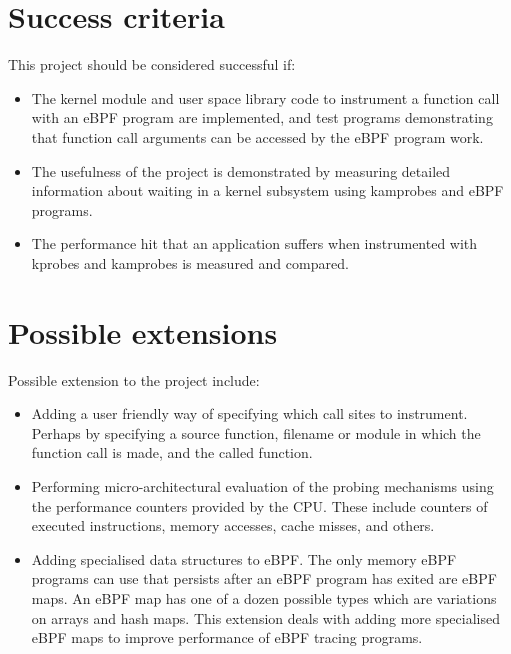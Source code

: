 \section*{Success criteria}

    This project should be considered successful if:
    \begin{itemize}
        \item The kernel module and user space library code to instrument a function call with an eBPF program are implemented, and
        test programs demonstrating that function call arguments can be accessed by the eBPF program work.

        \item The usefulness of the project is demonstrated by measuring detailed information about waiting in 
        a kernel subsystem using kamprobes and eBPF programs.

        \item The performance hit that an application suffers when instrumented with kprobes and kamprobes is 
        measured and compared.

    \end{itemize}

\section*{Possible extensions}

    Possible extension to the project include:
    \begin{itemize}
        \item Adding a user friendly way of specifying which call sites to instrument. Perhaps by specifying a
        source function, filename or module in which the function call is made, and the called function.

        \item Performing micro-architectural evaluation of the probing mechanisms using the performance counters
        provided by the CPU. These include counters of executed instructions, memory accesses, cache misses, and others.
        
        \item Adding specialised data structures to eBPF. The only memory eBPF programs can use that persists after an
        eBPF program has exited are eBPF maps. An eBPF map has one of a dozen possible types which are variations
        on arrays and hash maps. This extension deals with adding more specialised eBPF maps to improve performance
        of eBPF tracing programs.
    \end{itemize}

